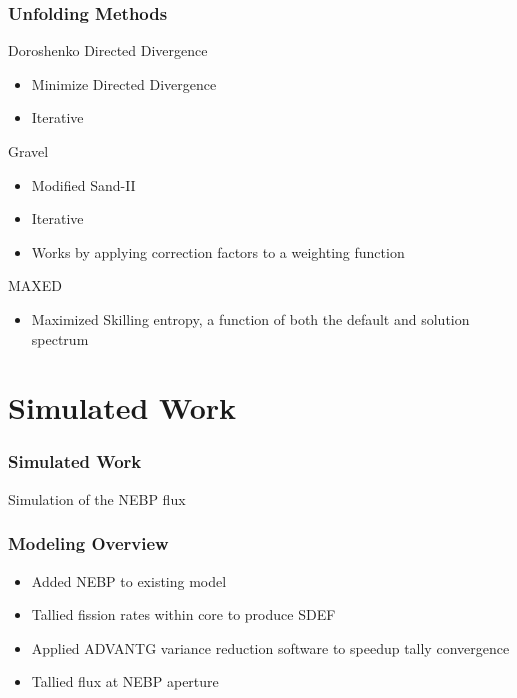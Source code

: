\documentclass[fleqn]{beamer}
\begin{document}
\begin{frame}
\frametitle{Unfolding Methods}

Doroshenko Directed Divergence \cite{doroshenko1977new}
\begin{itemize}
\item Minimize Directed Divergence
\item Iterative
\end{itemize}

Gravel \cite{reginatto2004umg}
\begin{itemize}
\item Modified Sand-II \cite{mcelroy1967computer}
\item Iterative
\item Works by applying correction factors to a weighting function
\end{itemize}

MAXED \cite{reginatto2002spectrum} 
\begin{itemize}
\item Maximized Skilling entropy, a function of both the default and solution spectrum
\end{itemize}


\end{frame}


\section{Simulated Work}

\begin{frame}
\frametitle{Simulated Work}

Simulation of the NEBP flux

\end{frame}


\begin{frame}
\frametitle{Modeling Overview}

\begin{itemize}
\item Added NEBP to existing model
\item Tallied fission rates within core to produce SDEF
\item Applied ADVANTG variance reduction software to speedup tally convergence
\item Tallied flux at NEBP aperture
\end{itemize}

\end{frame}
\end{document}
